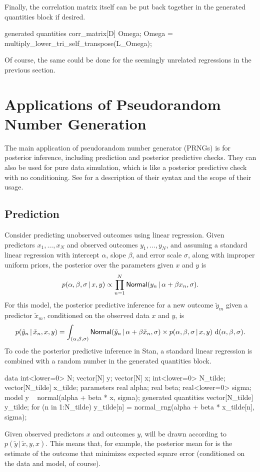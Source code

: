 Finally, the correlation matrix itself can be put back together in the
generated quantities block if desired. 
%
\begin{stancode}
generated quantities {
  corr_matrix[D] Omega;
  Omega = multiply_lower_tri_self_transpose(L_Omega);  
}
\end{stancode}
%
Of course, the same could be done for the seemingly unrelated
regressions in the previous section.

\section{Applications of Pseudorandom Number Generation}

The main application of pseudorandom number generator (PRNGs) is for
posterior inference, including prediction and posterior predictive
checks.  They can also be used for pure data simulation, which is like
a posterior predictive check with no conditioning.  See
 for a description of their syntax and
the scope of their usage.

\subsection{Prediction}

Consider predicting unobserved outcomes using linear
regression.  Given predictors $x_1, \ldots, x_N$ and observed outcomes
$y_1,\ldots,y_N$, and assuming a standard linear regression with
intercept $\alpha$, slope $\beta$, and error scale $\sigma$, along with
improper uniform priors, the posterior over the parameters given $x$
and $y$ is
%
\[
p(\alpha, \beta, \sigma \, | \, x, y) 
\propto 
\prod_{n=1}^N 
  \distro{Normal}(y_n \, | \, \alpha + \beta x_n, \sigma).
\]
%
For this model, the posterior predictive inference for a new outcome
$\tilde{y}_m$ given a predictor $\tilde{x}_m$, conditioned on the
observed data $x$ and $y$, is
\[
p(\tilde{y}_n \, | \, \tilde{x}_n, x, y)
= \int_{(\alpha,\beta,\sigma)}
  \distro{Normal}(\tilde{y}_n \, | \, \alpha + \beta \tilde{x}_n, \sigma)
  \times
  p(\alpha, \beta, \sigma \, | \, x, y) 
  \
  \mathrm{d}(\alpha,\beta,\sigma).
\]
%
To code the posterior predictive inference in Stan, a standard linear
regression is combined with a random number in the generated
quantities block.
%
\begin{stancode}
data {
  int<lower=0> N;
  vector[N] y;
  vector[N] x;
  int<lower=0> N_tilde;
  vector[N_tilde] x_tilde;
}
parameters {
  real alpha;
  real beta;
  real<lower=0> sigma;
}
model {
  y ~ normal(alpha + beta * x, sigma);
}
generated quantities {
  vector[N_tilde] y_tilde;
  for (n in 1:N_tilde)
    y_tilde[n] = normal_rng(alpha + beta * x_tilde[n], sigma);
}
\end{stancode}
%
Given observed predictors $x$ and outcomes $y$,  will
be drawn according to $p(\tilde{y} \, | \, \tilde{x}, y, x)$.  This
means that, for example, the posterior mean for \code{y\_tilde} is the
estimate of the outcome that minimizes expected square error
(conditioned on the data and model, of course).

